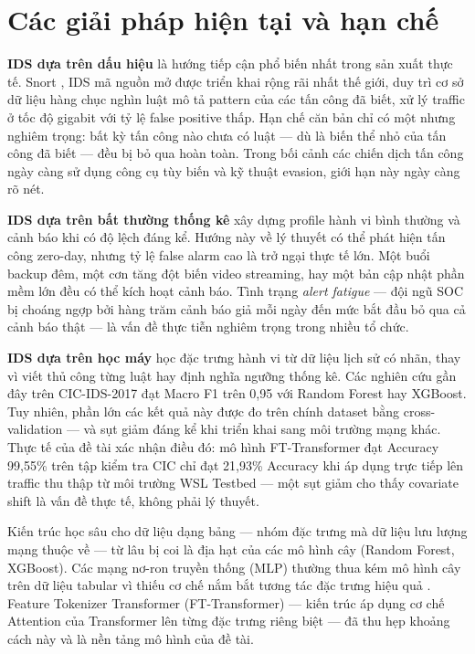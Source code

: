 \documentclass[../DoAn.tex]{subfiles}
\begin{document}
\section{Các giải pháp hiện tại và hạn chế}
\label{sec:gp}

\textbf{IDS dựa trên dấu hiệu} là hướng tiếp cận phổ biến nhất trong sản xuất thực tế. Snort \cite{roesch1999}, IDS mã nguồn mở được triển khai rộng rãi nhất thế giới, duy trì cơ sở dữ liệu hàng chục nghìn luật mô tả pattern của các tấn công đã biết, xử lý traffic ở tốc độ gigabit với tỷ lệ false positive thấp. Hạn chế căn bản chỉ có một nhưng nghiêm trọng: bất kỳ tấn công nào chưa có luật --- dù là biến thể nhỏ của tấn công đã biết --- đều bị bỏ qua hoàn toàn. Trong bối cảnh các chiến dịch tấn công ngày càng sử dụng công cụ tùy biến và kỹ thuật evasion, giới hạn này ngày càng rõ nét.

\textbf{IDS dựa trên bất thường thống kê} xây dựng profile hành vi bình thường và cảnh báo khi có độ lệch đáng kể. Hướng này về lý thuyết có thể phát hiện tấn công zero-day, nhưng tỷ lệ false alarm cao là trở ngại thực tế lớn. Một buổi backup đêm, một cơn tăng đột biến video streaming, hay một bản cập nhật phần mềm lớn đều có thể kích hoạt cảnh báo. Tình trạng \textit{alert fatigue} --- đội ngũ SOC bị choáng ngợp bởi hàng trăm cảnh báo giả mỗi ngày đến mức bắt đầu bỏ qua cả cảnh báo thật --- là vấn đề thực tiễn nghiêm trọng trong nhiều tổ chức.

\textbf{IDS dựa trên học máy} học đặc trưng hành vi từ dữ liệu lịch sử có nhãn, thay vì viết thủ công từng luật hay định nghĩa ngưỡng thống kê. Các nghiên cứu gần đây trên CIC-IDS-2017 \cite{sharafaldin2018} đạt Macro F1 trên 0,95 với Random Forest hay XGBoost. Tuy nhiên, phần lớn các kết quả này được đo trên chính dataset bằng cross-validation --- và sụt giảm đáng kể khi triển khai sang môi trường mạng khác. Thực tế của đề tài xác nhận điều đó: mô hình FT-Transformer đạt Accuracy 99,55\% trên tập kiểm tra CIC chỉ đạt 21,93\% Accuracy khi áp dụng trực tiếp lên traffic thu thập từ môi trường WSL Testbed --- một sụt giảm cho thấy covariate shift là vấn đề thực tế, không phải lý thuyết.

Kiến trúc học sâu cho dữ liệu dạng bảng --- nhóm đặc trưng mà dữ liệu lưu lượng mạng thuộc về --- từ lâu bị coi là địa hạt của các mô hình cây (Random Forest, XGBoost). Các mạng nơ-ron truyền thống (MLP) thường thua kém mô hình cây trên dữ liệu tabular vì thiếu cơ chế nắm bắt tương tác đặc trưng hiệu quả \cite{gorishniy2021}. Feature Tokenizer Transformer (FT-Transformer) --- kiến trúc áp dụng cơ chế Attention của Transformer lên từng đặc trưng riêng biệt --- đã thu hẹp khoảng cách này và là nền tảng mô hình của đề tài.
\end{document}
